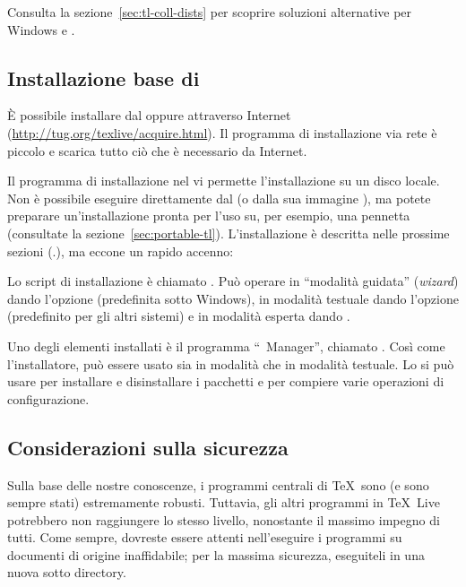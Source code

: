 \documentclass{article}
\begin{document}
Consulta la sezione~\ref{sec:tl-coll-dists} per scoprire soluzioni
alternative per Windows e \MacOSX.

\subsection{Installazione base di \protect\TL{}}
\label{sec:basic}

È possibile installare \TL{} dal \DVD{} oppure attraverso Internet
(\url{http://tug.org/texlive/acquire.html}). Il programma di installazione
via rete è piccolo e scarica tutto ciò che è necessario da Internet.

Il programma di installazione nel \DVD{} vi permette l'installazione su un
disco locale. Non è possibile eseguire \TL{} direttamente dal \DVD{} \TK{}
(o dalla sua immagine ), ma potete preparare un'installazione
pronta per l'uso su, per esempio, una pennetta \USB{} (consultate la
sezione~\ref{sec:portable-tl}). L'installazione è descritta nelle prossime
sezioni (\p.\pageref{sec:install}), ma eccone un rapido accenno:

\begin{itemize*}

\item Lo script di installazione è chiamato .
  Può operare in ``modalità guidata'' (\emph{wizard}) dando l'opzione
   (predefinita sotto Windows), in modalità testuale
  dando l'opzione  (predefinito per gli altri sistemi) e
  in modalità \GUI{} esperta dando .

\item Uno degli elementi installati è il programma ``\TL\ Manager'',
  chiamato . Così come l'installatore, può essere usato sia in
  modalità \GUI{} che in modalità testuale. Lo si può usare per installare
  e disinstallare i pacchetti e per compiere varie operazioni di
  configurazione.

\end{itemize*}


\subsection{Considerazioni sulla sicurezza}
\label{sec:security}

Sulla base delle nostre conoscenze, i programmi centrali di \TeX\ sono (e
sono sempre stati) estremamente robusti. Tuttavia, gli altri programmi in
\TeX\ Live potrebbero non raggiungere lo stesso livello, nonostante il
massimo impegno di tutti. Come sempre, dovreste essere attenti
nell'eseguire i programmi su documenti di origine inaffidabile; per la
massima sicurezza, eseguiteli in una nuova sotto directory.
\end{document}
